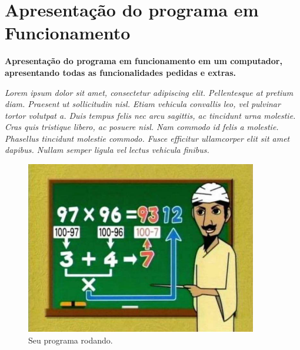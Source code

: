 \section{Apresentação do programa em Funcionamento}
\textbf{Apresentação do programa em funcionamento em um computador, apresentando todas as funcionalidades pedidas e extras.}

\textit{
Lorem ipsum dolor sit amet, consectetur adipiscing elit. Pellentesque at pretium
diam. Praesent ut sollicitudin nisl. Etiam vehicula convallis leo, vel pulvinar tortor
volutpat a. Duis tempus felis nec arcu sagittis, ac tincidunt urna molestie. Cras quis
tristique libero, ac posuere nisl. Nam commodo id felis a molestie. Phasellus tincidunt
molestie commodo. Fusce efficitur ullamcorper elit sit amet dapibus. Nullam semper
ligula vel lectus vehicula finibus.
}

\begin{figure}
\centering
	\includegraphics[width=0.90\textwidth]{imagens/programa.jpg}
	\caption{Seu programa rodando.}
\end{figure}